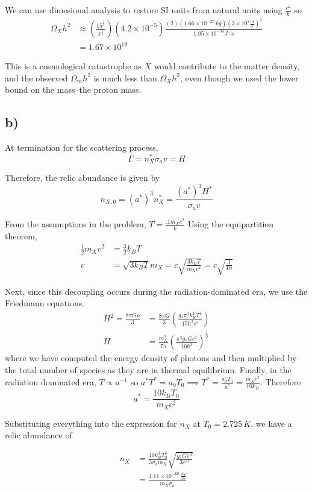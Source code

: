 \documentclass{article}
\begin{document}
We can use dimesional analysis to restore SI units from natural units using $\frac{c^2}{\hbar}$ so 
\begin{align*}
\Omega_X h^2 &\approx \left(\frac{15^{\frac{3}{4}}}{\pi^{\frac{7}{2}}}\right)(4.2\times 10^{-5})\frac{(2)(1.66\times 10^{-27}\,kg)(3\times 10^8 \frac{m}{s})^2}{1.05\times 10^{-34}J\cdot s}\\
&= 1.67\times 10^{19}
\end{align*}

This is a cosmological catastrophe as $X$ would contribute to the matter density, and the observed $\Omega_m h^2$ is much less than $\Omega_X h^2$, even though we used the lower bound on the mass--the proton mass.
\subsection*{b)}
At termination for the scattering process,
\[\Gamma = n^*_X \sigma_a v = H\]

Therefore, the relic abundance is given by 
\[n_{X,0} = (a^*)^3 n^*_X = \frac{(a^*)^3 H^*}{\sigma_a v}\]

From the assumptions in the problem, $T = \frac{.1m_X c^2}{k}$ Using the equipartition theorem,
\begin{align*}
\frac{1}{2}m_Xv^2 &=\frac{3}{2}k_B T\\
v &= \sqrt{3k_B T}{m_X} = c\sqrt{\frac{3k_B T}{m_X c^2}} = c\sqrt{\frac{3}{10}}
\end{align*}

Next, since this decoupling occurs during the radiation-dominated era, we use the Friedmann equations.
\begin{align*}
H^2 = \frac{8\pi G \rho}{3} &= \frac{8\pi G}{3}\left(\frac{g_*\pi^2 k_B^4T^4}{15\hbar^3 c^5}\right)\\
H &= \frac{m_X^2}{75}\left(\frac{\pi^3 g_* G c^3}{10\hbar^3}\right)^{\frac{1}{2}}
\end{align*}
where we have computed the energy density of photons and then multiplied by the total number of species as they are in thermal equilibrium. Finally, in the radiation dominated era, $T\propto a^{-1}$ so $a^*T^*=a_0T_0\implies T^* = \frac{a_0 T_0}{a^*}= \frac{m_X c^2}{10k_B}$. Therefore
\[a^* = \frac{10 k_B T_0}{m_X c^2}\]

Substituting everything into the expression for $n_X$ at $T_0=2.725\,K$, we have a relic abundance of

\begin{align*}
n_X &= \frac{40 k_B^3 T_0^3}{3\sigma_a m_X}\sqrt{\frac{g_* G \pi^3}{3 c^{11}}}\\
&=\frac{4.11\times 10^{-66}\,\frac{kg}{m}}{m_X \sigma_a}
\end{align*}
\end{document}
